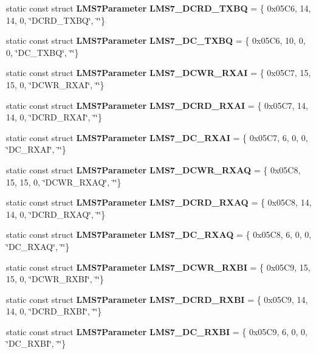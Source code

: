 \begin{DoxyCompactItemize}
\item 
static const struct {\bf L\+M\+S7\+Parameter} {\bf L\+M\+S7\+\_\+\+D\+C\+R\+D\+\_\+\+T\+X\+BQ} = \{ 0x05\+C6, 14, 14, 0, \char`\"{}\+D\+C\+R\+D\+\_\+\+T\+X\+B\+Q\char`\"{}, \char`\"{}\char`\"{}\}
\item 
static const struct {\bf L\+M\+S7\+Parameter} {\bf L\+M\+S7\+\_\+\+D\+C\+\_\+\+T\+X\+BQ} = \{ 0x05\+C6, 10, 0, 0, \char`\"{}\+D\+C\+\_\+\+T\+X\+B\+Q\char`\"{}, \char`\"{}\char`\"{}\}
\item 
static const struct {\bf L\+M\+S7\+Parameter} {\bf L\+M\+S7\+\_\+\+D\+C\+W\+R\+\_\+\+R\+X\+AI} = \{ 0x05\+C7, 15, 15, 0, \char`\"{}\+D\+C\+W\+R\+\_\+\+R\+X\+A\+I\char`\"{}, \char`\"{}\char`\"{}\}
\item 
static const struct {\bf L\+M\+S7\+Parameter} {\bf L\+M\+S7\+\_\+\+D\+C\+R\+D\+\_\+\+R\+X\+AI} = \{ 0x05\+C7, 14, 14, 0, \char`\"{}\+D\+C\+R\+D\+\_\+\+R\+X\+A\+I\char`\"{}, \char`\"{}\char`\"{}\}
\item 
static const struct {\bf L\+M\+S7\+Parameter} {\bf L\+M\+S7\+\_\+\+D\+C\+\_\+\+R\+X\+AI} = \{ 0x05\+C7, 6, 0, 0, \char`\"{}\+D\+C\+\_\+\+R\+X\+A\+I\char`\"{}, \char`\"{}\char`\"{}\}
\item 
static const struct {\bf L\+M\+S7\+Parameter} {\bf L\+M\+S7\+\_\+\+D\+C\+W\+R\+\_\+\+R\+X\+AQ} = \{ 0x05\+C8, 15, 15, 0, \char`\"{}\+D\+C\+W\+R\+\_\+\+R\+X\+A\+Q\char`\"{}, \char`\"{}\char`\"{}\}
\item 
static const struct {\bf L\+M\+S7\+Parameter} {\bf L\+M\+S7\+\_\+\+D\+C\+R\+D\+\_\+\+R\+X\+AQ} = \{ 0x05\+C8, 14, 14, 0, \char`\"{}\+D\+C\+R\+D\+\_\+\+R\+X\+A\+Q\char`\"{}, \char`\"{}\char`\"{}\}
\item 
static const struct {\bf L\+M\+S7\+Parameter} {\bf L\+M\+S7\+\_\+\+D\+C\+\_\+\+R\+X\+AQ} = \{ 0x05\+C8, 6, 0, 0, \char`\"{}\+D\+C\+\_\+\+R\+X\+A\+Q\char`\"{}, \char`\"{}\char`\"{}\}
\item 
static const struct {\bf L\+M\+S7\+Parameter} {\bf L\+M\+S7\+\_\+\+D\+C\+W\+R\+\_\+\+R\+X\+BI} = \{ 0x05\+C9, 15, 15, 0, \char`\"{}\+D\+C\+W\+R\+\_\+\+R\+X\+B\+I\char`\"{}, \char`\"{}\char`\"{}\}
\item 
static const struct {\bf L\+M\+S7\+Parameter} {\bf L\+M\+S7\+\_\+\+D\+C\+R\+D\+\_\+\+R\+X\+BI} = \{ 0x05\+C9, 14, 14, 0, \char`\"{}\+D\+C\+R\+D\+\_\+\+R\+X\+B\+I\char`\"{}, \char`\"{}\char`\"{}\}
\item 
static const struct {\bf L\+M\+S7\+Parameter} {\bf L\+M\+S7\+\_\+\+D\+C\+\_\+\+R\+X\+BI} = \{ 0x05\+C9, 6, 0, 0, \char`\"{}\+D\+C\+\_\+\+R\+X\+B\+I\char`\"{}, \char`\"{}\char`\"{}\}

\end{DoxyCompactItemize}
